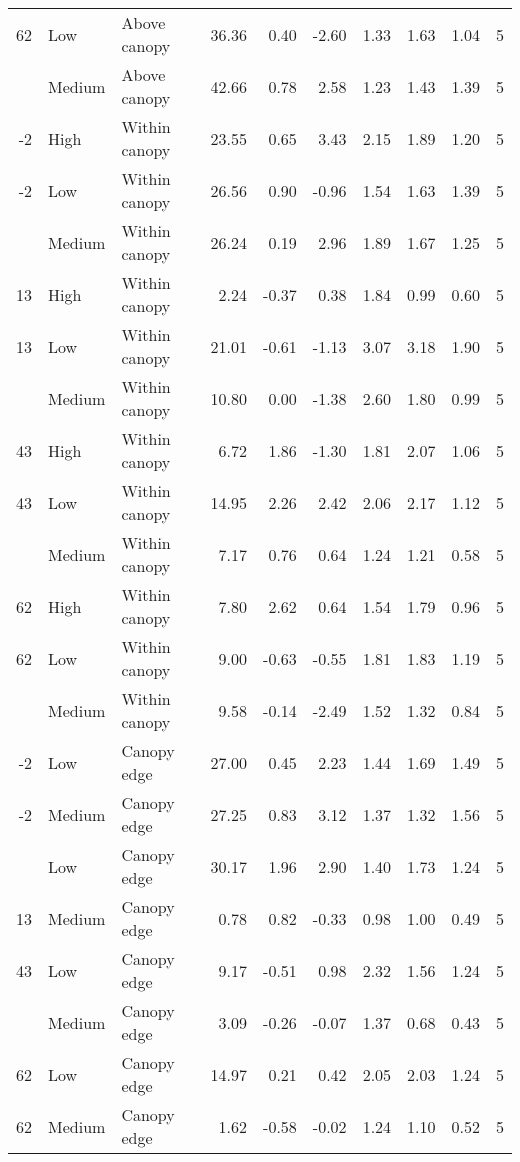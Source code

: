 \documentclass[10pt,]{article}
\begin{document}
\begin{longtable}{rllrrrrrrr}
62 & Low & Above canopy & 36.36 & 0.40 & -2.60 & 1.33 & 1.63 & 1.04 & 5\\
\addlinespace
62 & Medium & Above canopy & 42.66 & 0.78 & 2.58 & 1.23 & 1.43 & 1.39 & 5\\
-2 & High & Within canopy & 23.55 & 0.65 & 3.43 & 2.15 & 1.89 & 1.20 & 5\\
-2 & Low & Within canopy & 26.56 & 0.90 & -0.96 & 1.54 & 1.63 & 1.39 & 5\\
\addlinespace
-2 & Medium & Within canopy & 26.24 & 0.19 & 2.96 & 1.89 & 1.67 & 1.25 & 5\\
13 & High & Within canopy & 2.24 & -0.37 & 0.38 & 1.84 & 0.99 & 0.60 & 5\\
13 & Low & Within canopy & 21.01 & -0.61 & -1.13 & 3.07 & 3.18 & 1.90 & 5\\
\addlinespace
13 & Medium & Within canopy & 10.80 & 0.00 & -1.38 & 2.60 & 1.80 & 0.99 & 5\\
43 & High & Within canopy & 6.72 & 1.86 & -1.30 & 1.81 & 2.07 & 1.06 & 5\\
43 & Low & Within canopy & 14.95 & 2.26 & 2.42 & 2.06 & 2.17 & 1.12 & 5\\
\addlinespace
43 & Medium & Within canopy & 7.17 & 0.76 & 0.64 & 1.24 & 1.21 & 0.58 & 5\\
62 & High & Within canopy & 7.80 & 2.62 & 0.64 & 1.54 & 1.79 & 0.96 & 5\\
62 & Low & Within canopy & 9.00 & -0.63 & -0.55 & 1.81 & 1.83 & 1.19 & 5\\
\addlinespace
62 & Medium & Within canopy & 9.58 & -0.14 & -2.49 & 1.52 & 1.32 & 0.84 & 5\\
-2 & Low & Canopy edge & 27.00 & 0.45 & 2.23 & 1.44 & 1.69 & 1.49 & 5\\
-2 & Medium & Canopy edge & 27.25 & 0.83 & 3.12 & 1.37 & 1.32 & 1.56 & 5\\
\addlinespace
13 & Low & Canopy edge & 30.17 & 1.96 & 2.90 & 1.40 & 1.73 & 1.24 & 5\\
13 & Medium & Canopy edge & 0.78 & 0.82 & -0.33 & 0.98 & 1.00 & 0.49 & 5\\
43 & Low & Canopy edge & 9.17 & -0.51 & 0.98 & 2.32 & 1.56 & 1.24 & 5\\
\addlinespace
43 & Medium & Canopy edge & 3.09 & -0.26 & -0.07 & 1.37 & 0.68 & 0.43 & 5\\
62 & Low & Canopy edge & 14.97 & 0.21 & 0.42 & 2.05 & 2.03 & 1.24 & 5\\
62 & Medium & Canopy edge & 1.62 & -0.58 & -0.02 & 1.24 & 1.10 & 0.52 & 5\\*
\end{longtable}\endgroup{}
\end{document}
